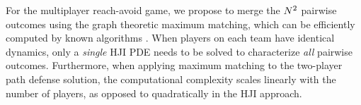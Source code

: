 For the multiplayer reach-avoid game, we propose to merge the $N^2$ pairwise outcomes using the graph theoretic maximum matching, which can be efficiently computed by known algorithms \cite{Schrjiver2004, Karpinski1998}. When players on each team have identical dynamics, only a \textit{single} HJI PDE needs to be solved to characterize \textit{all} pairwise outcomes. Furthermore, when applying maximum matching to the two-player path defense solution, the computational complexity scales linearly with the number of players, as opposed to quadratically in the HJI approach.